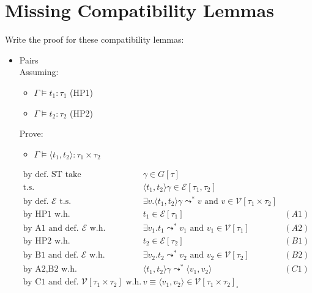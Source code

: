 \documentclass{article}
\newcommand{\pair}[1]{\ensuremath{\langle#1\rangle}}
\newcommand{\V}{\ensuremath{\mathcal{V}}}
\newcommand{\cE}{\ensuremath{\mathcal{E}}}
\newcommand{\AND}[0]{\ensuremath {\text{ and }}}
\begin{document}
\section{Missing Compatibility Lemmas}
Write the proof for these compatibility lemmas:
\begin{itemize}
    \item Pairs \\
        Assuming: \begin{itemize}
            \item $\Gamma \vDash t_1:\tau_1$ (HP1)
            \item $\Gamma \vDash t_2:\tau_2$ (HP2)
        \end{itemize}
        Prove: \begin{itemize}
            \item $\Gamma \vDash \langle t_1,t_2 \rangle : \tau_1\times\tau_2$
        \end{itemize}
        \begin{align*}
            \text{by def. ST take} &\ \gamma \in G[\tau] \\
            \text{t.s.} &\ \pair{t_1,t_2}\gamma\in\cE[\tau_1,\tau_2] \\
            \text{by def. $\cE$ t.s.} &\ \exists v.\pair{t_1,t_2}\gamma\leadsto^{*}v\AND v\in\V[\tau_1\times\tau_2] \\
            \text{by HP1 w.h.} &\ t_1\in\cE[\tau_1] & (A1) \\
            \text{by A1 and def. $\cE$ w.h.} &\ \exists v_1.t_1 \leadsto^{*}v_1\AND v_1\in\V[\tau_1] & (A2) \\
            \text{by HP2 w.h.} &\ t_2\in\cE[\tau_2] & (B1) \\
            \text{by B1 and def. $\cE$ w.h.} &\ \exists v_2.t_2 \leadsto^{*}v_2\AND v_2\in\V[\tau_2] & (B2) \\
            \text{by A2,B2 w.h.} &\ \pair{t_1,t_2}\gamma \leadsto^{*}\pair{v_1,v_2} & (C1) \\
            \text{by C1 and def. $\V[\tau_1\times\tau_2]$ w.h.} &\ v\equiv\pair{v_1,v_2}\in\V[\tau_1\times\tau_2]_\square
        \end{align*}


\end{itemize}
\end{document}
